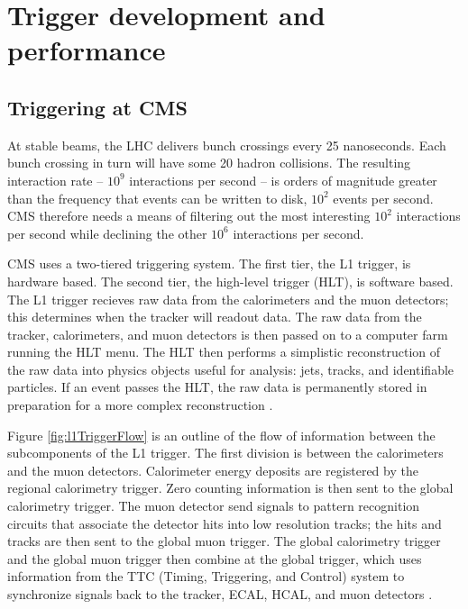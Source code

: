 \setlength\abovedisplayskip{0.4pt}
\setlength\belowdisplayskip{0.4pt}

\chapter{Trigger development and performance}

\section{Triggering at CMS}

At stable beams, the LHC delivers bunch crossings every 25 nanoseconds. Each bunch crossing in turn will have some 20 hadron collisions. The resulting interaction rate -- $10^9$ interactions per second -- is orders of magnitude greater than the frequency that events can be written to disk, $10^2$ events per second. CMS therefore needs a means of filtering out the most interesting $10^2$ interactions per second while declining the other $10^6$ interactions per second. 

CMS uses a two-tiered triggering system. The first tier, the L1 trigger, is hardware based. The second tier, the high-level trigger (HLT), is software based. The L1 trigger recieves raw data from the calorimeters and the muon detectors; this determines when the tracker will readout data. The raw data from the tracker, calorimeters, and muon detectors is then passed on to a computer farm running the HLT menu. The HLT then performs a simplistic reconstruction of the raw data into physics objects useful for analysis: jets, tracks, and identifiable particles. If an event passes the HLT, the raw data is permanently stored in preparation for a more complex reconstruction \cite{Dasu:2000ge}\cite{Sphicas:2002gg}. 

Figure \ref{fig:l1TriggerFlow} is an outline of the flow of information between the subcomponents of the L1 trigger. The first division is between the calorimeters and the muon detectors. Calorimeter energy deposits are registered by the regional calorimetry trigger. Zero counting information is then sent to the global calorimetry trigger. The muon detector send signals to pattern recognition circuits that associate the detector hits into low resolution tracks; the hits and tracks are then sent to the global muon trigger. The global calorimetry trigger and the global muon trigger then combine at the global trigger, which uses information from the TTC (Timing, Triggering, and Control) system to synchronize signals back to the tracker, ECAL, HCAL, and muon detectors \cite{Khachatryan:2016bia}. 

